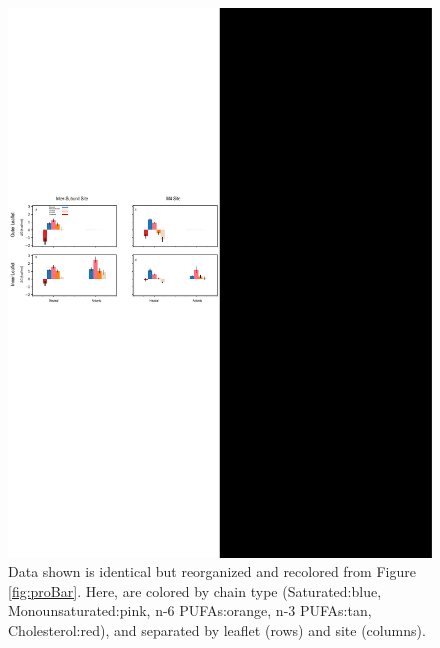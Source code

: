 \begin{figure}[!h]
	\center
	\includegraphics[width=\linewidth]{./Figures/Lipid_centric.pdf}
	\caption[\Newaffinities{} organized to reveal lipid preferences by site.] {Data shown is identical but reorganized and recolored from Figure \ref{fig:proBar}. Here, \newaffinities are colored by chain type (Saturated:blue, Monounsaturated:pink, n-6 PUFAs:orange, n-3 PUFAs:tan, Cholesterol:red), and separated by leaflet (rows) and site (columns).} %
	\label{fig:lipidBar}
\end{figure}

